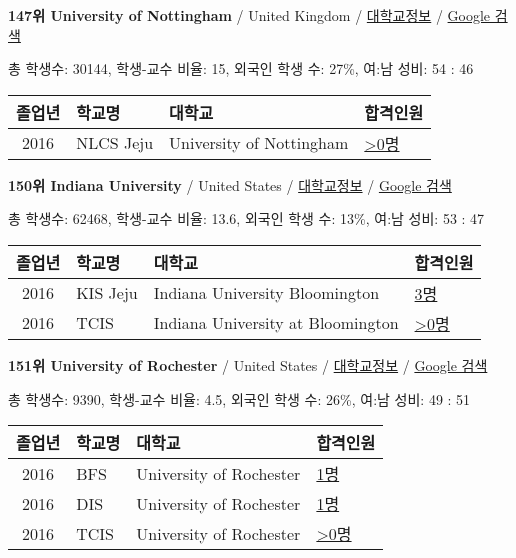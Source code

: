 \documentclass[13pt,]{article}
\begin{document}
\textbf{147위 University of Nottingham} / United Kingdom /
\href{https://www.timeshighereducation.com/world-university-rankings/university-of-nottingham?ranking-dataset=589595}{대학교정보}
/ \href{http://www.google.com/search?q=University+of+Nottingham}{Google
검색}

총 학생수: 30144, 학생-교수 비율: 15, 외국인 학생 수: 27\%, 여:남 성비:
54 : 46

\begin{longtable}[]{@{}clll@{}}
\toprule
졸업년 & 학교명 & 대학교 & 합격인원\tabularnewline
\midrule
\endhead
2016 & NLCS Jeju & University of Nottingham &
\href{http://cafe.naver.com/assarabia/11592}{\textgreater{}0명}\tabularnewline
\bottomrule
\end{longtable}

\textbf{150위 Indiana University} / United States /
\href{https://www.timeshighereducation.com/world-university-rankings/indiana-university?ranking-dataset=589595}{대학교정보}
/ \href{http://www.google.com/search?q=Indiana+University}{Google 검색}

총 학생수: 62468, 학생-교수 비율: 13.6, 외국인 학생 수: 13\%, 여:남
성비: 53 : 47

\begin{longtable}[]{@{}clll@{}}
\toprule
졸업년 & 학교명 & 대학교 & 합격인원\tabularnewline
\midrule
\endhead
2016 & KIS Jeju & Indiana University Bloomington &
\href{http://cafe.naver.com/assarabia/11596}{3명}\tabularnewline
2016 & TCIS & Indiana University at Bloomington &
\href{http://cafe.naver.com/assarabia/11598}{\textgreater{}0명}\tabularnewline
\bottomrule
\end{longtable}

\textbf{151위 University of Rochester} / United States /
\href{https://www.timeshighereducation.com/world-university-rankings/university-of-rochester?ranking-dataset=589595}{대학교정보}
/ \href{http://www.google.com/search?q=University+of+Rochester}{Google
검색}

총 학생수: 9390, 학생-교수 비율: 4.5, 외국인 학생 수: 26\%, 여:남 성비:
49 : 51

\begin{longtable}[]{@{}clll@{}}
\toprule
졸업년 & 학교명 & 대학교 & 합격인원\tabularnewline
\midrule
\endhead
2016 & BFS & University of Rochester &
\href{http://cafe.naver.com/assarabia/11597}{1명}\tabularnewline
2016 & DIS & University of Rochester &
\href{http://cafe.naver.com/assarabia/11591}{1명}\tabularnewline
2016 & TCIS & University of Rochester &
\href{http://cafe.naver.com/assarabia/11598}{\textgreater{}0명}\tabularnewline
\bottomrule
\end{longtable}
\end{document}
